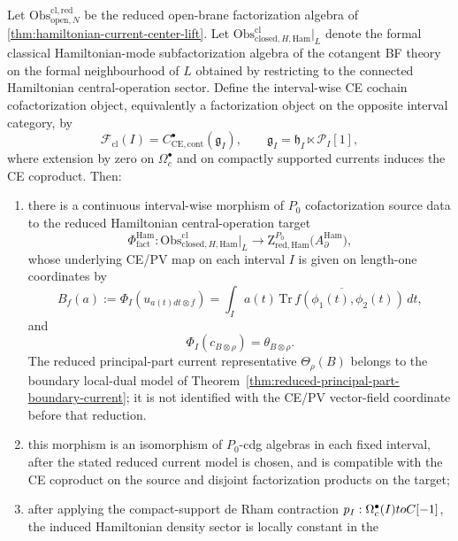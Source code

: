 \documentclass[11pt]{memoir}
\begin{document}
\begin{thm}\label{thm:hamiltonian-current-factorization}
  Let $\mathrm{Obs}^{\mathrm{cl,red}}_{\mathrm{open},N}$ be the reduced
  open-brane factorization algebra of
  \ref{thm:hamiltonian-current-center-lift}. Let
  $\mathrm{Obs}^{\mathrm{cl}}_{\mathrm{closed},H,\mathrm{Ham}}|_{L}$
  denote the formal classical Hamiltonian-mode subfactorization
  algebra of the cotangent BF theory on the formal neighbourhood of
  \(L\) obtained by restricting to the connected Hamiltonian
  central-operation sector. Define the interval-wise CE cochain
  cofactorization object, equivalently a factorization object on the
  opposite interval category, by
  $$\mathcal F_{\mathrm{cl}}(I)
    =C^\bullet_{\mathrm{CE},\mathrm{cont}}(\mathfrak g_I),\qquad
    \mathfrak g_I=\mathfrak h_I\ltimes\mathcal P_I[1],$$
  where extension by zero on \(\Omega_c^\bullet\) and on compactly
  supported currents induces the CE coproduct. Then:
  \begin{enumerate}
    \item there is a continuous interval-wise morphism of $P_0$
      cofactorization source data to the reduced Hamiltonian
      central-operation target
      $$\Phi^{\mathrm{Ham}}_{\mathrm{fact}}:
        \mathrm{Obs}^{\mathrm{cl}}_{\mathrm{closed},H,\mathrm{Ham}}\big|_{L}
        \longrightarrow
        \mathrm Z^{P_0}_{\mathrm{red,Ham}}\bigl(A_\partial^{\mathrm{Ham}}\bigr),$$
      whose underlying CE/PV map on each interval \(I\) is given on
      length-one coordinates by
      $$B_f(a):=\Phi_I(u_{a(t)dt\otimes f})
        =\int_I a(t)\,\overline{\mathrm{Tr}\,f(\phi_1(t),\phi_2(t))}\,dt,$$
      and
      $$\Phi_I(c_{B\otimes\rho})=\theta_{B\otimes\rho}.$$
      The reduced principal-part current representative
      \(\Theta_\rho(B)\) belongs to the boundary local-dual model of
      Theorem~\ref{thm:reduced-principal-part-boundary-current}; it is
      not identified with the CE/PV vector-field coordinate before that
      reduction.
    \item this morphism is an isomorphism of \(P_0\)-cdg algebras in
      each fixed interval, after the stated reduced current model is
      chosen, and is compatible with the CE coproduct on the source and
      disjoint factorization products on the target;
    \item after applying the compact-support de Rham contraction
      \(p_I:\Omega_c^\bullet(I)toC[-1]\), the induced Hamiltonian
      density sector is locally constant in the

\end{enumerate}
\end{thm}
\end{document}
